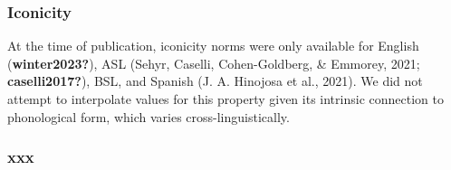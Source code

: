\documentclass[
  man,floatsintext]{apa6}
\begin{document}
\hypertarget{iconicity}{%
\subsubsection{Iconicity}\label{iconicity}}

At the time of publication, iconicity norms were only available for English (\textbf{winter2023?}), ASL (Sehyr, Caselli, Cohen-Goldberg, \& Emmorey, 2021; \textbf{caselli2017?}), BSL, and Spanish (J. A. Hinojosa et al., 2021). We did not attempt to interpolate values for this property given its intrinsic connection to phonological form, which varies cross-linguistically.

\hypertarget{xxx}{%
\subsubsection{xxx}\label{xxx}}
\end{document}

